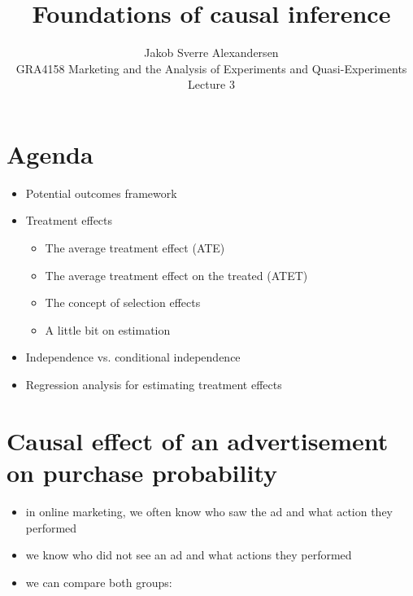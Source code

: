 \documentclass[10pt]{article}
\begin{document}
 
\title{Foundations of causal inference}
\author{Jakob Sverre Alexandersen\\
GRA4158 Marketing and the Analysis of Experiments and Quasi-Experiments\\
Lecture 3}
\maketitle

\tableofcontents
\newpage
\section{Agenda}
\begin{itemize}
    \item Potential outcomes framework
    \item Treatment effects 
    \begin{itemize}
        \item The average treatment effect (ATE)
        \item The average treatment effect on the treated (ATET)
        \item The concept of selection effects 
        \item A little bit on estimation
    \end{itemize}
    \item Independence vs. conditional independence 
    \item Regression analysis for estimating treatment effects 
\end{itemize}
\section{Causal effect of an advertisement on purchase probability}
\begin{itemize}
    \item in online marketing, we often know who saw the ad and what action they performed
    \item we know who did not see an ad and what actions they performed 
    \item we can compare both groups:
\end{itemize}
\end{document}
